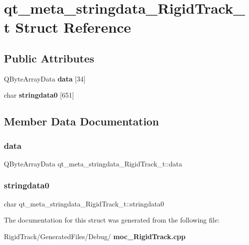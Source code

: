 \section{qt\+\_\+meta\+\_\+stringdata\+\_\+\+Rigid\+Track\+\_\+t Struct Reference}
\label{structqt__meta__stringdata___rigid_track__t}
\subsection*{Public Attributes}
\begin{DoxyCompactItemize}
\item 
Q\+Byte\+Array\+Data \textbf{ data} [34]
\item 
char \textbf{ stringdata0} [651]
\end{DoxyCompactItemize}


\subsection{Member Data Documentation}
\mbox{\label{structqt__meta__stringdata___rigid_track__t_ab6ce38dcdd6d5162cfc05928307eb564}} 
\subsubsection{data}
{\footnotesize\ttfamily Q\+Byte\+Array\+Data qt\+\_\+meta\+\_\+stringdata\+\_\+\+Rigid\+Track\+\_\+t\+::data}

\mbox{\label{structqt__meta__stringdata___rigid_track__t_ac51ec637d23bab4c04f9b97dba465403}} 
\subsubsection{stringdata0}
{\footnotesize\ttfamily char qt\+\_\+meta\+\_\+stringdata\+\_\+\+Rigid\+Track\+\_\+t\+::stringdata0}



The documentation for this struct was generated from the following file\+:\begin{DoxyCompactItemize}
\item 
Rigid\+Track/\+Generated\+Files/\+Debug/\textbf{ moc\+\_\+\+Rigid\+Track.\+cpp}\end{DoxyCompactItemize}
